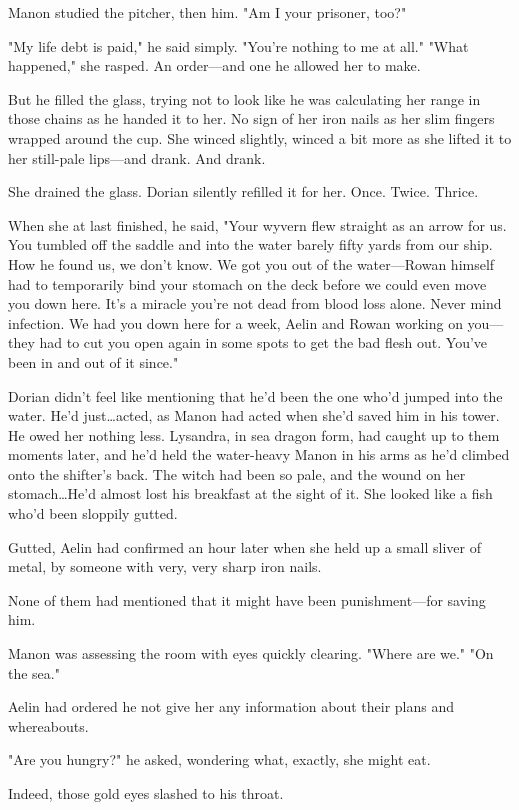 Manon studied the pitcher, then him.
"Am I your prisoner, too?"

"My life debt is paid," he said simply.
"You're nothing to me at all."
"What happened," she rasped.
An order---and one he allowed her to make.

But he filled the glass, trying not to look like he was calculating her range in those chains as he handed it to her.
No sign of her iron nails as her slim fingers wrapped around the cup.
She winced slightly, winced a bit more as she lifted it to her still-pale lips---and drank.
And drank.

She drained the glass.
Dorian silently refilled it for her.
Once.
Twice.
Thrice.

When she at last finished, he said, "Your wyvern flew straight as an arrow for us.
You tumbled off the saddle and into the water barely fifty yards from our ship.
How he found us, we don't know.
We got you out of the water---Rowan himself had to temporarily bind your stomach on the deck before we could even move you down here.
It's a miracle you're not dead from blood loss alone.
Never mind infection.
We had you down here for a week, Aelin and Rowan working on you---they had to cut you open again in some spots to get the bad flesh out.
You've been in and out of it since."

Dorian didn't feel like mentioning that he'd been the one who'd jumped into the water.
He'd just\ldots acted, as Manon had acted when she'd saved him in his tower.
He owed her nothing less.
Lysandra, in sea dragon form, had caught up to them moments later, and he'd held the water-heavy Manon in his arms as he'd climbed onto the shifter's back.
The witch had been so pale, and the wound on her stomach\ldots He'd almost lost his breakfast at the sight of it.
She looked like a fish who'd been sloppily gutted.

Gutted, Aelin had confirmed an hour later when she held up a small sliver of metal, by someone with very, very sharp iron nails.

None of them had mentioned that it might have been punishment---for saving him.

Manon was assessing the room with eyes quickly clearing.
"Where are we."
"On the sea."

Aelin had ordered he not give her any information about their plans and whereabouts.

"Are you hungry?"
he asked, wondering what, exactly, she might eat.

Indeed, those gold eyes slashed to his throat.

